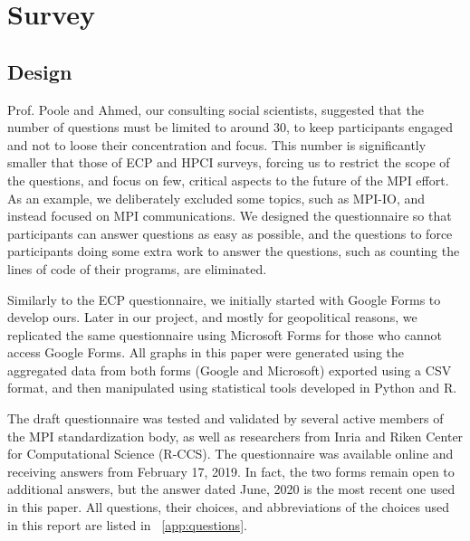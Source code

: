 \documentclass[preprint,5p,times]{elsarticle}
\newcommand{\revision}[2]{{\color{blue}#2}}
\begin{document}
\section{Survey}

\subsection*{Design}
%
\revision{The social scientists}{Prof. Poole and Ahmed, our consulting social
scientists,} suggested that the number of questions must be
limited \revision{}{to}
around 30, to keep participants engaged and not to loose their concentration and
focus. This number is significantly smaller that those of ECP and HPCI surveys,
forcing us to restrict the scope of the questions, and focus on few, critical
aspects to the future of the MPI effort. As an example, we deliberately excluded
some topics, such as MPI-IO, and instead focused on MPI communications.
We designed the questionnaire so that participants can answer questions
as easy as possible, and the questions to force participants doing
some extra work to answer the questions, such as counting the lines of
code of their programs, are eliminated.

Similarly to the ECP questionnaire, we initially started with Google Forms to
develop ours. Later in our project, and mostly for geopolitical reasons, we
replicated the same questionnaire using Microsoft Forms for those who cannot
access Google Forms. All graphs in this paper were generated using the
aggregated data from both forms (Google and Microsoft) exported using a \revision{CVS}{CSV}
format, and then manipulated using statistical tools developed in Python and R.

The draft questionnaire was tested and validated by several active members of
the MPI standardization body, as well as researchers from Inria and Riken Center
for Computational Science (R-CCS).
The questionnaire was available online and receiving answers from February
17, 2019\revision{until recently}{}. In fact, the two forms remain open to additional 
answers, \revision{but taking in account the rate of the contributions
  we do not expect the outcome to drastically change}{but the answer
  dated June, 2020 is the most recent one used in this paper}. 
All questions, their choices, and abbreviations of the choices used in
this report are listed in ~\ref{app:questions}.
\end{document}
